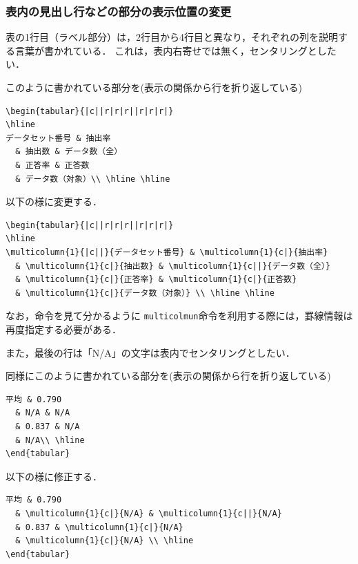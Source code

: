 \subsubsection{表内の見出し行などの部分の表示位置の変更}
表の1行目（ラベル部分）は，2行目から4行目と異なり，それぞれの列を説明する言葉が書かれている．
これは，表内右寄せでは無く，センタリングとしたい．

このように書かれている部分を(表示の関係から行を折り返している)
\begin{breakbox}
{\small
\begin{verbatim}
\begin{tabular}{|c||r|r|r||r|r|r|}
\hline
データセット番号 & 抽出率
  & 抽出数 & データ数（全）
  & 正答率 & 正答数
  & データ数（対象）\\ \hline \hline
\end{verbatim}
}
\end{breakbox}
以下の様に変更する．
\begin{breakbox}
{\small
\begin{verbatim}
\begin{tabular}{|c||r|r|r||r|r|r|}
\hline
\multicolumn{1}{|c||}{データセット番号} & \multicolumn{1}{c|}{抽出率}
  & \multicolumn{1}{c|}{抽出数} & \multicolumn{1}{c||}{データ数（全）}
  & \multicolumn{1}{c|}{正答率} & \multicolumn{1}{c|}{正答数}
  & \multicolumn{1}{c|}{データ数（対象）} \\ \hline \hline
\end{verbatim}
}
\end{breakbox}

なお，命令を見て分かるように \verb+multicolmun+命令を利用する際には，罫線情報は再度指定する必要がある．

また，最後の行は「N/A」の文字は表内でセンタリングとしたい．

同様にこのように書かれている部分を(表示の関係から行を折り返している)
\begin{breakbox}
{\small
\begin{verbatim}
平均 & 0.790
  & N/A & N/A
  & 0.837 & N/A
  & N/A\\ \hline
\end{tabular}
\end{verbatim}
}
\end{breakbox}
以下の様に修正する．
\begin{breakbox}
{\small
\begin{verbatim}
平均 & 0.790
  & \multicolumn{1}{c|}{N/A} & \multicolumn{1}{c||}{N/A}
  & 0.837 & \multicolumn{1}{c|}{N/A}
  & \multicolumn{1}{c|}{N/A} \\ \hline
\end{tabular}
\end{verbatim}
}
\end{breakbox}

